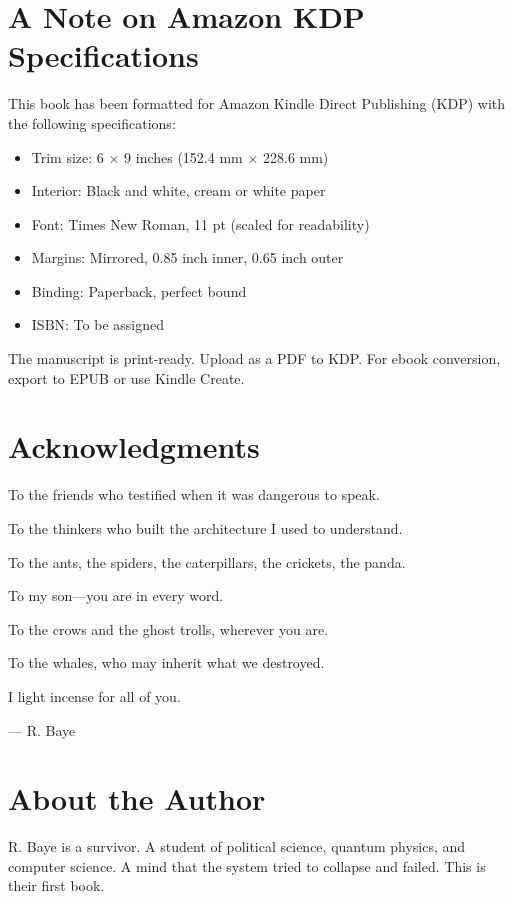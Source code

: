 \documentclass[11pt,openany]{book}
\begin{document}
\chapter{A Note on Amazon KDP Specifications}

This book has been formatted for Amazon Kindle Direct Publishing (KDP) with the following specifications:

\begin{itemize}
\item Trim size: 6 $\times$ 9 inches (152.4 mm $\times$ 228.6 mm)
\item Interior: Black and white, cream or white paper
\item Font: Times New Roman, 11 pt (scaled for readability)
\item Margins: Mirrored, 0.85 inch inner, 0.65 inch outer
\item Binding: Paperback, perfect bound
\item ISBN: To be assigned
\end{itemize}

The manuscript is print-ready. Upload as a PDF to KDP. For ebook conversion, export to EPUB or use Kindle Create.

\chapter*{Acknowledgments}

To the friends who testified when it was dangerous to speak.

To the thinkers who built the architecture I used to understand.

To the ants, the spiders, the caterpillars, the crickets, the panda.

To my son---you are in every word.

To the crows and the ghost trolls, wherever you are.

To the whales, who may inherit what we destroyed.

I light incense for all of you.

\vspace{3ex}
\begin{flushright}
--- R. Baye
\end{flushright}

\chapter*{About the Author}

R. Baye is a survivor. A student of political science, quantum physics, and computer science. A mind that the system tried to collapse and failed. This is their first book.
\end{document}
